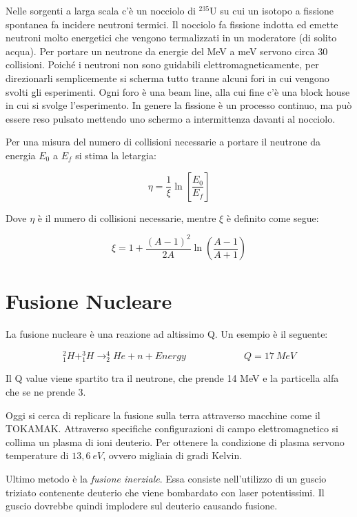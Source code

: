 Nelle sorgenti a larga scala c'è un nocciolo di $^{235}\text{U}$ su cui un isotopo a fissione spontanea fa incidere neutroni termici. Il nocciolo fa fissione indotta ed emette neutroni molto energetici che vengono termalizzati in un moderatore (di solito acqua). Per portare un neutrone da energie del MeV a meV servono circa 30 collisioni. Poiché i neutroni non sono guidabili elettromagneticamente, per direzionarli semplicemente si scherma tutto tranne alcuni fori in cui vengono svolti gli esperimenti. Ogni foro è una beam line, alla cui fine c'è una block house in cui si svolge l'esperimento. In genere la fissione è un processo continuo, ma può essere reso pulsato mettendo uno schermo a intermittenza davanti al nocciolo.

Per una misura del numero di collisioni necessarie a portare il neutrone da energia $E_0$ a $E_f$ si stima la letargia:

\begin{equation}
\eta=\frac{1}{\xi}\ln\left[\frac{E_0}{E_f}\right]
\end{equation}

Dove $\eta$ è il numero di collisioni necessarie, mentre $\xi$ è definito come segue:

\begin{equation}
\xi=1+\frac{(A-1)^2}{2A}\ln\left(\frac{A-1}{A+1}\right)
\end{equation}

\section{Fusione Nucleare}

La fusione nucleare è una reazione ad altissimo Q. Un esempio è il seguente:

\begin{equation}
_1^2H+_1^3H \longrightarrow _2^4He+n+Energy \qquad \qquad \qquad Q=17\ MeV
\end{equation}

Il Q value viene spartito tra il neutrone, che prende 14 MeV e la particella alfa che se ne prende 3. 

Oggi si cerca di replicare la fusione sulla terra attraverso macchine come il TOKAMAK. Attraverso specifiche configurazioni di campo elettromagnetico si collima un plasma di ioni deuterio. Per ottenere la condizione di plasma servono temperature di $13,6 \ eV$, ovvero migliaia di gradi Kelvin. 

Ultimo metodo è la \emph{fusione inerziale}. Essa consiste nell'utilizzo di un guscio triziato contenente deuterio che viene bombardato con laser potentissimi. Il guscio dovrebbe quindi implodere sul deuterio causando fusione.


